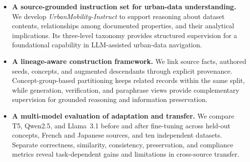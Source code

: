 \documentclass[a4paper,fleqn]{cas-sc}
\begin{document}
\begin{itemize}

    \item \textbf{A source-grounded instruction set for urban-data understanding.}
    We develop \textit{UrbanMobility-Instruct} to support reasoning about dataset contents, relationships among documented properties, and their analytical implications. Its three-level taxonomy provides structured supervision for a foundational capability in LLM-assisted urban-data navigation.

    \item \textbf{A lineage-aware construction framework.}
    We link source facts, authored seeds, concepts, and augmented descendants through explicit provenance. Concept-group-based partitioning keeps related records within the same split, while generation, verification, and paraphrase views provide complementary supervision for grounded reasoning and information preservation.

    \item \textbf{A multi-model evaluation of adaptation and transfer.}
    We compare T5, Qwen2.5, and Llama~3.1 before and after fine-tuning across held-out concepts, French and Japanese sources, and ten independent datasets. Separate correctness, similarity, consistency, preservation, and compliance metrics reveal task-dependent gains and limitations in cross-source transfer.

\end{itemize}




\end{document}

